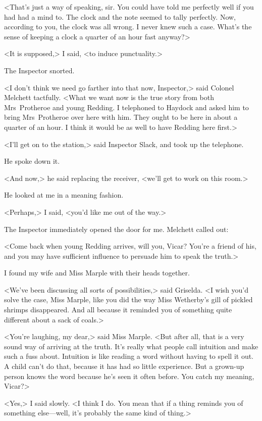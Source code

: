 <That's just a way of speaking, sir. You could have told me perfectly well if you had had a mind to. The clock and the note seemed to tally perfectly. Now, according to you, the clock was all wrong. I never knew such a case. What's the sense of keeping a clock a quarter of an hour fast anyway?>

<It is supposed,> I said, <to induce punctuality.>

The Inspector snorted.

<I don't think we need go farther into that now, Inspector,> said Colonel Melchett tactfully. <What we want now is the true story from both Mrs~Protheroe and young Redding. I telephoned to Haydock and asked him to bring Mrs~Protheroe over here with him. They ought to be here in about a quarter of an hour. I think it would be as well to have Redding here first.>

<I'll get on to the station,> said Inspector Slack, and took up the telephone.

He spoke down it.

<And now,> he said replacing the receiver, <we'll get to work on this room.>

He looked at me in a meaning fashion.

<Perhaps,> I said, <you'd like me out of the way.>

The Inspector immediately opened the door for me. Melchett called out:

<Come back when young Redding arrives, will you, Vicar? You're a friend of his, and you may have sufficient influence to persuade him to speak the truth.>

I found my wife and Miss Marple with their heads together.

<We've been discussing all sorts of possibilities,> said Griselda. <I wish you'd solve the case, Miss Marple, like you did the way Miss Wetherby's gill of pickled shrimps disappeared. And all because it reminded you of something quite different about a sack of coals.>

<You're laughing, my dear,> said Miss Marple. <But after all, that is a very sound way of arriving at the truth. It's really what people call intuition and make such a fuss about. Intuition is like reading a word without having to spell it out. A child can't do that, because it has had so little experience. But a grown-up person knows the word because he's seen it often before. You catch my meaning, Vicar?>

<Yes,> I said slowly. <I think I do. You mean that if a thing reminds you of something else—well, it's probably the same kind of thing.>


